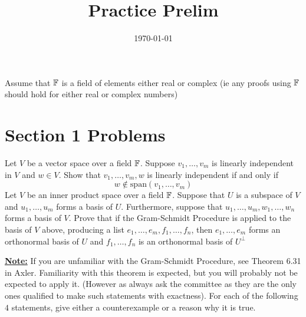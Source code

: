 \documentclass[answers]{exam}
\title{Practice Prelim}
\date{\today}
\author{}
\newcommand{\spanV}[1]{\text{span}\left(#1\right)}
\begin{document}
\maketitle

Assume that $\mathbb{F}$ is a field of elements either real or complex (ie any proofs using $\mathbb{F}$ should hold for either
real or complex numbers)

\section*{Section 1 Problems}

\begin{questions}
    \question Let $V$ be a vector space over a field $\mathbb{F}$. Suppose $v_1,\dots,v_m$ is linearly independent in $V$ and $w\in V$. Show that $v_1,\dots,v_m,w$ is
    linearly independent if and only if 
    \[
        w\not\in\spanV{v_1,\dots,v_m}
    \]
    \question Let $V$ be an inner product space over a field $\mathbb{F}$. Suppose that $U$ is a subspace of $V$ and 
    $u_1,\dots,u_m$ forms a basis of $U$. Furthermore, suppose that $u_1,\dots,u_m,w_1,\dots,w_n$ forms a basis
    of $V$. Prove that if the Gram-Schmidt Procedure is applied to the basis of $V$ above, producing a list
    $e_1,\dots,e_m,f_1,\dots,f_n$, then $e_1,\dots,e_m$ forms an orthonormal basis of $U$ and $f_1,\dots,f_n$ is
    an orthonormal basis of $U^\perp$

    \textbf{\underline{Note:}} If you are unfamiliar with the Gram-Schmidt Procedure, see Theorem 6.31 in Axler. 
    Familiarity with this theorem is expected, but you will probably not be expected to apply it. (However as 
    always ask the committee as they are the only ones qualified to make such statements with exactness).
    \question For each of the following $4$ statements, give either a counterexample or a reason why it is true.
\end{questions}
\end{document}
